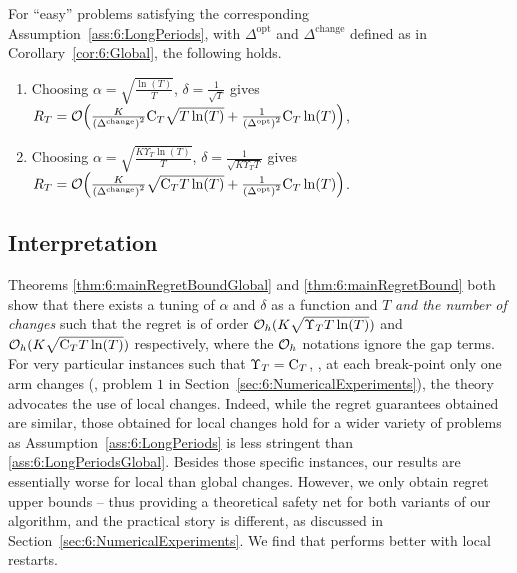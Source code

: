 \begin{corollary}\label{cor:6:Local}
    For ``easy'' problems satisfying the corresponding Assumption~\ref{ass:6:LongPeriods},
    with $\Delta^{\text{opt}}$ and ${\Delta}^{\text{change}}$ defined as in Corollary~\ref{cor:6:Global}, the following holds.
    \begin{enumerate}
        \item Choosing $\alpha = \sqrt{\frac{\ln(T)}{T}}$, $\delta = \frac{1}{\sqrt{T}}$ gives $R_T = \mathop{}\mathopen{}\mathcal{O}\mathopen{}\left(\frac{K}{\left({\Delta}^{\text{change}}\right)^2} \mathrm{C}_T\sqrt{T\ln(T)} + \frac{1}{\left(\Delta^{\text{opt}}\right)^2} \mathrm{C}_T\ln(T)\right)$,
        \item Choosing $\alpha = \sqrt{\frac{K\Upsilon_T\ln(T)}{T}}$, $\delta = \frac{1}{\sqrt{K\Upsilon_T T}}$ gives $R_T = \mathop{}\mathopen{}\mathcal{O}\mathopen{}\left(\frac{K}{\left({\Delta}^{\text{change}}\right)^2}\sqrt{\mathrm{C}_T T\ln(T)} + \frac{1}{\left(\Delta^{\text{opt}}\right)^2} \mathrm{C}_T\ln(T)\right)$.
    \end{enumerate}
\end{corollary}


\subsection{Interpretation}

Theorems \ref{thm:6:mainRegretBoundGlobal} and \ref{thm:6:mainRegretBound} both show that there exists a tuning of $\alpha$ and $\delta$ as a function and $T$ \emph{and the number of changes} such that the regret is of order $\mathcal{O}_h(K\sqrt{\Upsilon_T T \ln(T)})$ and $\mathcal{O}_h(K\sqrt{\mathrm{C}_T T \ln(T)})$ respectively, where the $\mathcal{O}_h$ notations ignore the gap terms. For very particular instances such that $\Upsilon_T = \mathrm{C}_T$, \ie, at each break-point only one arm changes (\eg, problem $1$ in Section~\ref{sec:6:NumericalExperiments}), the theory advocates the use of local changes.
%
Indeed, while the regret guarantees obtained are similar, those obtained for local changes hold for a wider variety of problems as Assumption~\ref{ass:6:LongPeriods} is less stringent than \ref{ass:6:LongPeriodsGlobal}.
%
Besides those specific instances, our results are essentially worse for local than global changes. However, we only obtain regret upper bounds -- thus providing a theoretical safety net for both variants of our algorithm, and the practical story is different, as discussed in Section~\ref{sec:6:NumericalExperiments}. We find that \GLRklUCB{} performs better with local restarts.

